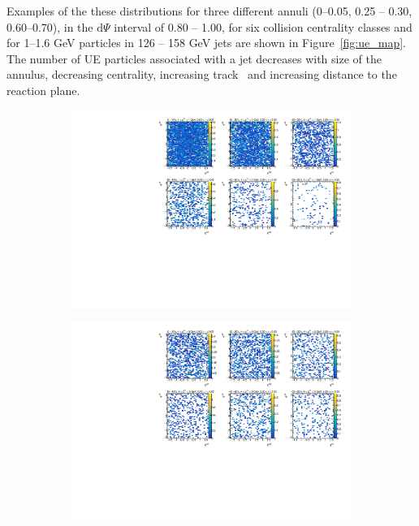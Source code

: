 Examples of the these distributions for three different annuli (0--0.05, 0.25 -- 0.30, 0.60--0.70), in the $\mathrm{d}\Psi$ interval of  0.80 -- 1.00, for six collision centrality classes and for 1--1.6 GeV particles in 126 -- 158 GeV jets are shown in Figure~\ref{fig:ue_map}.
The number of UE particles associated with a jet decreases with size of the annulus, decreasing centrality, increasing track \pT\ and increasing distance to the reaction plane.

\begin{figure}
\begin{subfigure}{.5\textwidth}
\centering \includegraphics[width=1\textwidth]{figures/main/UE/eta_phi_map_trk2_dR0}
\caption{}
\end{subfigure}
\begin{subfigure}{.5\textwidth}
\centering \includegraphics[width=1\textwidth]{figures/main/UE/eta_phi_map_trk6_dR0}

\end{subfigure}
\end{figure}
